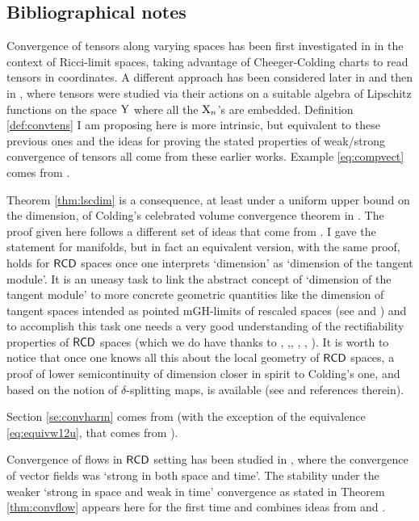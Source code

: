 \documentclass[11pt]{article}
\numberwithin{equation}{section}
\newcommand{\X}{{\rm X}}
\newcommand{\Y}{{\rm Y}}
\newcommand{\RCD}{{\sf RCD}}
\begin{document}
\subsection{Bibliographical notes}
{\footnotesize
Convergence of tensors along varying spaces has been first investigated in \cite{Honda11-2} in the context of Ricci-limit spaces, taking advantage of Cheeger-Colding charts to read tensors in coordinates. A different approach has been considered later in \cite{AST17}  and then in \cite{AH16}, where tensors were studied via their actions on a suitable algebra of Lipschitz functions on the space $\Y$ where all the $\X_n$'s are embedded. Definition \ref{def:convtens}  I am proposing here is more intrinsic, but equivalent to these previous ones and the ideas for proving the stated properties of weak/strong convergence of tensors  all come from these earlier works.   Example \ref{eq:compvect} comes from \cite[Remark 6.18]{Honda14}.


Theorem \ref{thm:lscdim} is a consequence, at least under a uniform upper bound on the dimension, of Colding's celebrated volume convergence theorem in \cite{Colding97}. The proof given here follows a different set of ideas that come from \cite{Honda14}. I gave the statement for manifolds, but in fact an equivalent version, with the same proof, holds for $\RCD$ spaces once one interprets `dimension' as `dimension of the tangent module'. It is an uneasy task to link the abstract concept of `dimension of the tangent module' to more concrete geometric quantities like the dimension of tangent spaces intended as pointed mGH-limits of rescaled spaces (see \cite{GP16} and \cite{IPS22}) and to accomplish this task one needs a very good understanding of the rectifiability properties of $\RCD$ spaces (which we do have  thanks to \cite{Gigli13}, \cite{Mondino-Naber14},\cite{BS18}, \cite{MK16}, \cite{GP16-2}, \cite{BPS21}). It is worth to notice that once one knows all this about the local geometry of $\RCD$ spaces, a proof of lower semicontinuity of dimension closer in spirit to Colding's one, and based on the notion of $\delta$-splitting maps, is available (see  \cite{BPS21} and references therein).

Section \ref{se:convharm} comes from \cite{AH16} (with the exception of the equivalence \eqref{eq:equivw12u}, that comes from \cite{AmbrosioGigliSavare11-2}).

Convergence of flows in $\RCD$ setting has been studied in \cite{AST17}, where the convergence of vector fields was `strong in both space and time'. The stability under the weaker `strong in space and weak in time' convergence as stated in Theorem \ref{thm:convflow} appears here for the first time and combines ideas from \cite{AST17} and \cite{GT18}.

}
\end{document}
